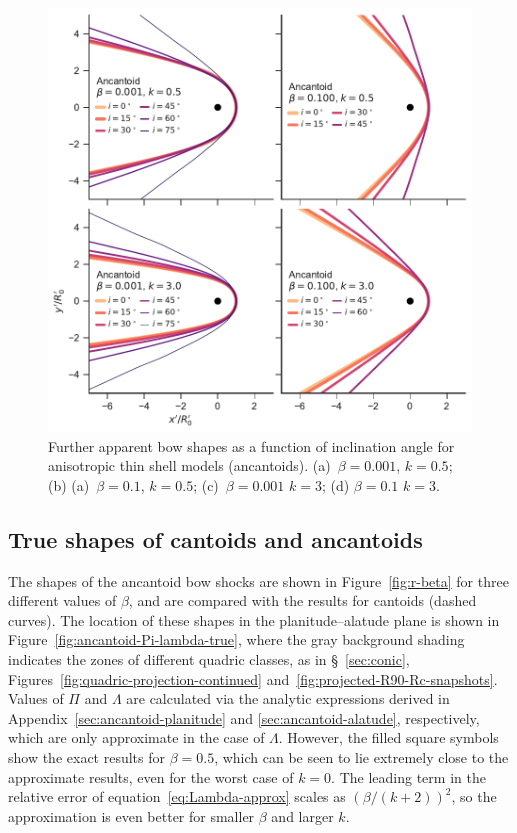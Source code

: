 \begin{figure}
  \centering
  \includegraphics[width=\linewidth]{figs/test_xyprime_ancantoid}
  \caption{Further apparent bow shapes as a function of inclination
    angle for anisotropic thin shell models (ancantoids).
    (a)~\(\beta = 0.001\), \(k = 0.5\); (b) (a)~\(\beta = 0.1\),
    \(k = 0.5\); (c)~\(\beta = 0.001\) \(k = 3\); (d)
    \(\beta = 0.1\) \(k = 3\).}
  \label{fig:xyprime-ancantoid}
\end{figure}


\subsection{True shapes of cantoids and ancantoids}
\label{sec:true-cantoids-ancantoids}

The shapes of the ancantoid bow shocks are shown in
Figure~\ref{fig:r-beta} for three different values of \(\beta\), and are
compared with the \CRW{} results for cantoids (dashed curves).  The
location of these shapes in the planitude--alatude plane is shown in
Figure~\ref{fig:ancantoid-Pi-lambda-true}, where the gray background
shading indicates the zones of different quadric classes, as in
\S~\ref{sec:conic}, Figures~\ref{fig:quadric-projection-continued}
and~\ref{fig:projected-R90-Rc-snapshots}.  Values of \(\Pi\) and
\(\Lambda\) are calculated via the analytic expressions derived in
Appendix~\ref{sec:ancantoid-planitude} and
\ref{sec:ancantoid-alatude}, respectively, which are only approximate
in the case of \(\Lambda\).  However, the filled square symbols show the
exact results for \(\beta = 0.5\), which can be seen to lie extremely close
to the approximate results, even for the worst case of \(k = 0\). The
leading term in the relative error of
equation~\eqref{eq:Lambda-approx} scales as \((\beta / (k + 2))^2\), so
the approximation is even better for smaller \(\beta\) and larger \(k\).

